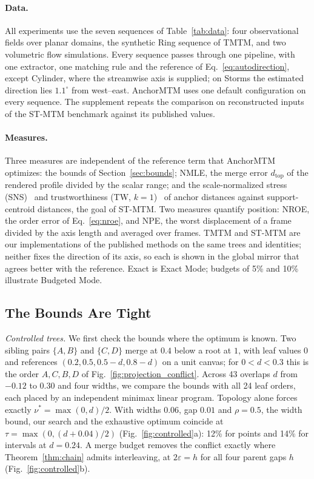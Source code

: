 \documentclass[preprint]{vgtc}   %
\newcommand{\dtop}{d_{\mathrm{top}}}
\begin{document}
\paragraph{Data.} All experiments use the seven sequences of Table~\ref{tab:data}: four observational fields over planar domains, the synthetic Ring sequence of TMTM, and two volumetric flow simulations. Every sequence passes through one pipeline, with one extractor, one matching rule and the reference of Eq.~\ref{eq:autodirection}, except Cylinder, where the streamwise axis is supplied; on Storms the estimated direction lies $1.1^\circ$ from west--east. AnchorMTM uses one default configuration on every sequence. The supplement repeats the comparison on reconstructed inputs of the ST-MTM benchmark against its published values.

\paragraph{Measures.} Three measures are independent of the reference term that AnchorMTM optimizes: the bounds of Section~\ref{sec:bounds}; NMLE, the merge error $\dtop$ of the rendered profile divided by the scalar range; and the scale-normalized stress (SNS)~\cite{Smelser:2025:Scale,STMTM:2026} and trustworthiness (TW, $k=1$)~\cite{Venna:2001:NP} of anchor distances against support-centroid distances, the goal of ST-MTM. Two measures quantify position: NROE, the order error of Eq.~\ref{eq:nroe}, and NPE, the worst displacement of a frame divided by the axis length and averaged over frames. TMTM and ST-MTM are our implementations of the published methods on the same trees and identities; neither fixes the direction of its axis, so each is shown in the global mirror that agrees better with the reference. Exact is Exact Mode; budgets of 5\% and 10\% illustrate Budgeted Mode.

\subsection{The Bounds Are Tight}\label{sec:bounds-eval}
\emph{Controlled trees.} We first check the bounds where the optimum is known. Two sibling pairs $\{A,B\}$ and $\{C,D\}$ merge at $0.4$ below a root at $1$, with leaf values $0$ and references $(0.2,0.5,0.5-d,0.8-d)$ on a unit canvas; for $0<d<0.3$ this is the order $A,C,B,D$ of Fig.~\ref{fig:projection_conflict}. Across 43 overlaps $d$ from $-0.12$ to $0.30$ and four widths, we compare the bounds with all 24 leaf orders, each placed by an independent minimax linear program. Topology alone forces exactly $\nu^*=\max(0,d)/2$. With widths $0.06$, gap $0.01$ and $\rho=0.5$, the width bound, our search and the exhaustive optimum coincide at $\tau=\max(0,(d+0.04)/2)$ (Fig.~\ref{fig:controlled}a): 12\% for points and 14\% for intervals at $d=0.24$. A merge budget removes the conflict exactly where Theorem~\ref{thm:chain} admits interleaving, at $2\varepsilon=h$ for all four parent gaps $h$ (Fig.~\ref{fig:controlled}b).
\end{document}
